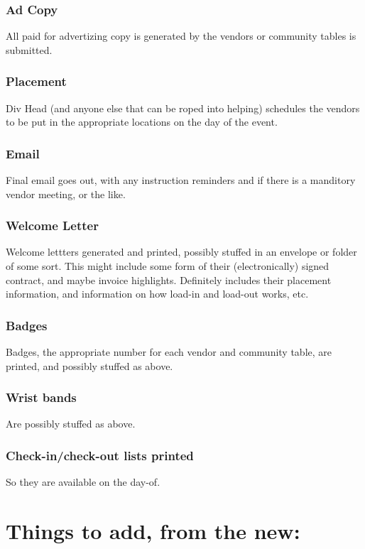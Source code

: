 \documentclass[captions=tablesignature]{scrartcl}
\begin{document}
\subsubsection{Ad Copy}
\label{sec-3-2-16}
All paid for advertizing copy is generated by the vendors or
community tables is submitted.

\subsubsection{Placement}
\label{sec-3-2-17}
Div Head (and anyone else that can be roped into helping)
schedules the vendors to be put in the appropriate locations on
the day of the event.

\subsubsection{Email}
\label{sec-3-2-18}
Final email goes out, with any instruction reminders and if there
is a manditory vendor meeting, or the like.

\subsubsection{Welcome Letter}
\label{sec-3-2-19}
Welcome lettters generated and printed, possibly stuffed in an
envelope or folder of some sort.
This might include some form of their (electronically) signed
contract, and maybe invoice highlights.  Definitely includes their
placement information, and information on how load-in and load-out
works, etc.

\subsubsection{Badges}
\label{sec-3-2-20}
Badges, the appropriate number for each vendor and community
table, are printed, and possibly stuffed as above.

\subsubsection{Wrist bands}
\label{sec-3-2-21}
Are possibly stuffed as above.

\subsubsection{Check-in/check-out lists printed}
\label{sec-3-2-22}
So they are available on the day-of.

\section{Things to add, from the new:}
\label{sec-4}
\end{document}
